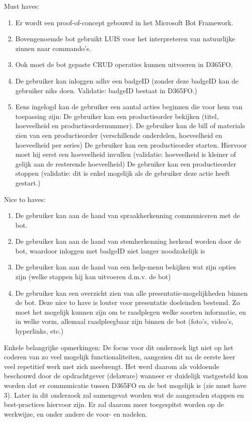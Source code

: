 Must haves:
\begin{enumerate}
    \item Er wordt een proof-of-concept gebouwd in het Microsoft Bot Framework. 
    \item Bovengenoemde bot gebruikt LUIS voor het interpreteren van natuurlijke zinnen naar commando's. 
    \item Ook moet de bot gepaste CRUD operaties kunnen uitvoeren in D365FO.
    \item De gebruiker kan inloggen adhv een badgeID (zonder deze badgeID kan de gebruiker niks doen. Validatie: badgeID bestaat in D365FO.)
    \item Eens ingelogd kan de gebruiker een aantal acties beginnen die voor hem van toepassing zijn:  
    \subitem De gebruiker kan een productieorder bekijken (titel, hoeveelheid en productieordernummer).
    \subitem De gebruiker kan de bill of materials zien van een productieorder (verschillende onderdelen, hoeveelheid en hoeveelheid per series)
    \subitem De gebruiker kan een productieorder starten. Hiervoor moet hij eerst een hoeveelheid invullen (validatie: hoeveelheid is kleiner of gelijk aan de resterende hoeveelheid)
    \subitem De gebruiker kan een productieorder stoppen (validatie: dit is enkel mogelijk als de gebruiker deze actie heeft gestart.) 
    
\end{enumerate}

Nice to haves:
\begin{enumerate}
    \item De gebruiker kan aan de hand van spraakherkenning communiceren met de bot.
    \item De gebruiker kan aan de hand van stemherkenning herkend worden door de bot, waardoor inloggen met badgeID niet langer noodzakelijk is
    \item De gebruiker kan aan de hand van een help-menu bekijken wat zijn opties zijn (welke stappen hij kan uitvoeren d.m.v. de bot)
    \item De gebruiker kan een overzicht zien van alle presentatie-mogelijkheden binnen de bot. Deze nice to have is louter voor presentatie doeleinden bestemd. Zo moet het mogelijk kunnen zijn om te raadplegen welke soorten informatie, en in welke vorm, allemaal raadpleegbaar zijn binnen de bot (foto's, video's, hyperlinks, etc.)
\end{enumerate}

Enkele belangrijke opmerkingen:
De focus voor dit onderzoek ligt niet op het coderen van zo veel mogelijk functionaliteiten, aangezien dit na de eerste keer veel repetitief werk met zich meebrengt. Het werd daarom als voldoende beschouwd door de opdrachtgever (delaware) wanneer er duidelijk vastgesteld kon worden dat er communicatie tussen D365FO en de bot mogelijk is (zie must have 3). Later in dit onderzoek zal samengevat worden wat de aangeraden stappen en best-practices hiervoor zijn.  Er zal daarom meer toegespitst worden op de werkwijze, en onder andere de voor- en nadelen. 


